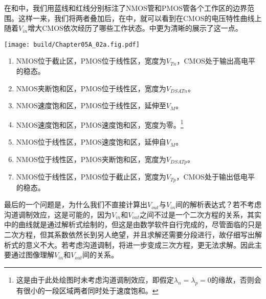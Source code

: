 在和中，我们用蓝线和红线分别标注了NMOS管和PMOS管各个工作区的边界范围。这样一来，我们将两者叠加后，在中，就可以看到在CMOS的电压特性曲线上随着$V_{in}$增大CMOS依次经历了哪些工作状态。中更为清晰的展示了这一点。

\begin{Figure}[CMOS反相器的电压传输特性曲线]
    \texttt{[image: build/Chapter05A\_02a.fig.pdf]}\hspace{0.7cm}
\end{Figure}

\begin{enumerate}
    \item NMOS位于截止区，PMOS位于线性区，宽度为$V_{Tn}$，CMOS处于输出高电平的稳态。
    \item NMOS夹断饱和区，PMOS位于线性区，宽度为$V_{DSATn}$。
    \item NMOS速度饱和区，PMOS位于线性区，延伸至$V_M$。
    \item NMOS速度饱和区，PMOS速度饱和区，宽度为零。\footnote{这是由于此处绘图时未考虑沟道调制效应，即假定$\lambda_n=\lambda_p=0$的缘故，否则会有很小的一段区域两者同时处于速度饱和。}
    \item NMOS位于线性区，PMOS速度饱和区，延伸自$V_M$。
    \item NMOS位于线性区，PMOS夹断饱和区，宽度为$V_{DSATp}$。
    \item NMOS位于线性区，PMOS位于截止区，宽度为$V_{Tp}$，CMOS处于输出低电平的稳态。
\end{enumerate}

最后的一个问题是，为什么我们不直接计算出$V_{out}$与$V_{in}$间的解析表达式？若不考虑沟道调制效应，这是可能的，因为$V_{in}$和$V_{out}$之间不过是一个二次方程的关系，其实中的曲线就是通过解析式绘制的，但这是由数学软件自行完成的，尽管面临的只是二次方程，但其系数依然长到另人绝望，并且求解还需要分段进行，故仔细写出解析式的意义不大。若考虑沟道调制，将进一步变成三次方程，更无法求解。因此主要通过图像理解$V_{in}$和$V_{out}$间的关系。